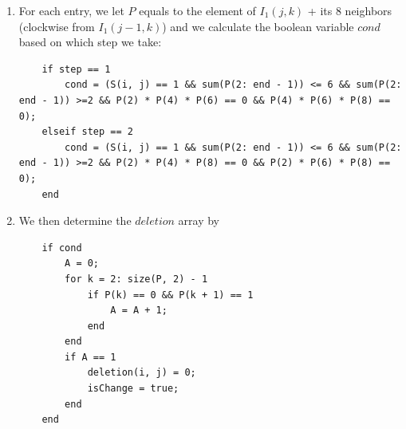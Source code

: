 \documentclass{article}
\begin{document}
\begin{enumerate}[label=(\alph*)]
\begin{enumerate}[label=(\roman*)]
            \item For each entry, we let $P$ equals to the element of $I_1(j, k)$ + its 8 neighbors (clockwise from $I_1(j - 1, k)$) and we calculate the boolean variable $cond$ based on which step we take:
            \begin{lstlisting}
    if step == 1
        cond = (S(i, j) == 1 && sum(P(2: end - 1)) <= 6 && sum(P(2: end - 1)) >=2 && P(2) * P(4) * P(6) == 0 && P(4) * P(6) * P(8) == 0);
    elseif step == 2
        cond = (S(i, j) == 1 && sum(P(2: end - 1)) <= 6 && sum(P(2: end - 1)) >=2 && P(2) * P(4) * P(8) == 0 && P(2) * P(6) * P(8) == 0);
    end
            \end{lstlisting}
                        
            \item We then determine the $deletion$ array by
            
            \begin{lstlisting}
    if cond
        A = 0;
        for k = 2: size(P, 2) - 1
            if P(k) == 0 && P(k + 1) == 1
                A = A + 1;
            end
        end
        if A == 1
            deletion(i, j) = 0;
            isChange = true;
        end
    end
        \end{lstlisting}
        \end{enumerate}


\end{enumerate}
\end{document}
